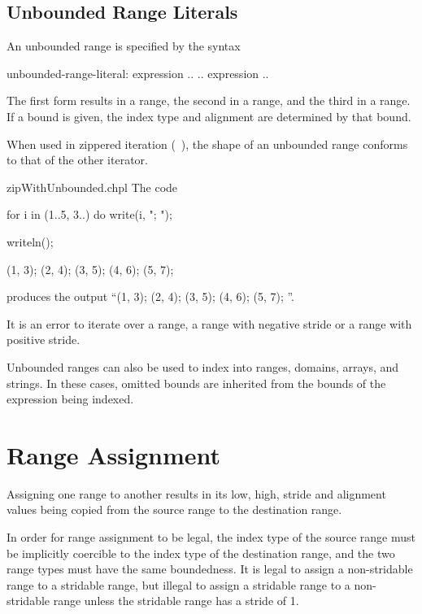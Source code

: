 \subsection{Unbounded Range Literals}
\label{Unbounded_Ranges}

An unbounded range is specified by the syntax
\begin{syntax}
unbounded-range-literal:
  expression ..
  .. expression
  ..
\end{syntax}

The first form results in a  range, the
second in a  range, and the third in
a  range.  If a bound is given, the index type and alignment are determined
by that bound.

When used in zippered iteration (~), the shape of an
unbounded range conforms to that of the other iterator.

\begin{chapelexample}{zipWithUnbounded.chpl}
The code
\begin{chapel}
for i in (1..5, 3..) do
  write(i, "; ");
\end{chapel}
\begin{chapelpost}
writeln();
\end{chapelpost}
\begin{chapeloutput}
(1, 3); (2, 4); (3, 5); (4, 6); (5, 7); 
\end{chapeloutput}
produces the output ``(1, 3); (2, 4); (3, 5); (4, 6); (5, 7); ''.
\end{chapelexample}

It is an error to iterate over a  range,
a  range with negative stride or a
 range with positive stride.

Unbounded ranges can also be used to index into ranges, domains,
arrays, and strings.  In these cases, omitted bounds are inherited
from the bounds of the expression being indexed.


\section{Range Assignment}
\label{Range_Assignment}

Assigning one range to another results in its low, high, stride and alignment
values being copied from the source range to the destination range.

In order for range assignment to be legal, the index type of the
source range must be implicitly coercible to the index type of the
destination range, and the two range types must have the same boundedness.
It is legal to assign a non-stridable range to a stridable
range, but illegal to assign a stridable range to a non-stridable
range unless the stridable range has a stride of 1.


